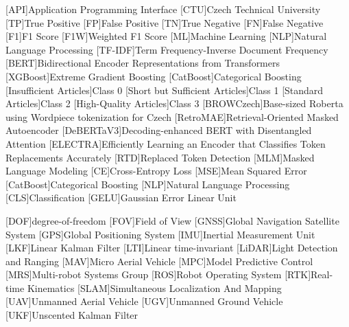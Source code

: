 
\begin{acronym}
  [API]{Application Programming Interface}
  [CTU]{Czech Technical University}
  [TP]{True Positive}
  [FP]{False Positive}
  [TN]{True Negative}
  [FN]{False Negative}
  [F1]{F1 Score}
  [F1W]{Weighted F1 Score}
  [ML]{Machine Learning}
  [NLP]{Natural Language Processing}
  [TF-IDF]{Term Frequency-Inverse Document Frequency}
  [BERT]{Bidirectional Encoder Representations from Transformers}
  [XGBoost]{Extreme Gradient Boosting}
  [CatBoost]{Categorical Boosting}
  [Insufficient Articles]{Class 0}
  [Short but Sufficient Articles]{Class 1}
  [Standard Articles]{Class 2}
  [High-Quality Articles]{Class 3}
  [BROWCzech]{Base-sized Roberta using Wordpiece tokenization for Czech}
  [RetroMAE]{Retrieval-Oriented Masked Autoencoder}
  [DeBERTaV3]{Decoding-enhanced BERT with Disentangled Attention}
  [ELECTRA]{Efficiently Learning an Encoder that Classifies Token Replacements Accurately}
  [RTD]{Replaced Token Detection}
  [MLM]{Masked Language Modeling}
  [CE]{Cross-Entropy Loss}
  [MSE]{Mean Squared Error}
  [CatBoost]{Categorical Boosting}
  [NLP]{Natural Language Processing}
  [CLS]{Classification}
  [GELU]{Gaussian Error Linear Unit}

  
  [DOF]{degree-of-freedom}
  [FOV]{Field of View}
  [GNSS]{Global Navigation Satellite System}
  [GPS]{Global Positioning System}
  [IMU]{Inertial Measurement Unit}
  [LKF]{Linear Kalman Filter}
  [LTI]{Linear time-invariant}
  [LiDAR]{Light Detection and Ranging}
  [MAV]{Micro Aerial Vehicle}
  [MPC]{Model Predictive Control}
  [MRS]{Multi-robot Systems Group}
  [ROS]{Robot Operating System}
  [RTK]{Real-time Kinematics}
  [SLAM]{Simultaneous Localization And Mapping}
  [UAV]{Unmanned Aerial Vehicle}
  [UGV]{Unmanned Ground Vehicle}
  [UKF]{Unscented Kalman Filter}
\end{acronym}
